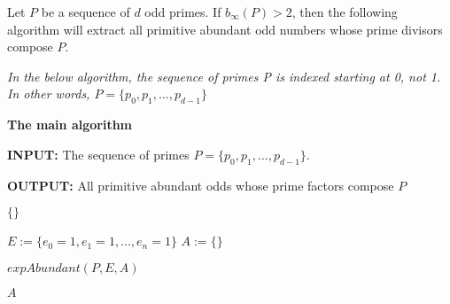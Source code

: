 \documentclass[../paper.tex]{subfiles}
\begin{document}
\begin{theorem} 
Let $P$ be a sequence of $d$ odd primes. If $b_{\infty}(P) > 2$, then the 
following algorithm will extract all primitive
abundant odd numbers whose prime divisors compose $P$.
\end{theorem}
%
%
%
%
%


\textit{In the below algorithm, the sequence of primes P is indexed 
starting at 0, not 1. In other words, $P = \{p_0, p_1, ..., p_{d-1}\}$}



{\setlength{\parindent}{0cm}

\textbf{The main algorithm}

\textbf{INPUT:} The sequence of primes 
$P = \{p_0, p_1, ..., p_{d-1}\}$.

\textbf{OUTPUT:} All primitive abundant odds whose prime factors
compose $P$

}


\begin{algorithmic}
  \RETURN $\{\}$
\ENDIF

\STATE $E := \{e_0 = 1,e_1 = 1,...,e_n = 1\}$
\STATE $A := \{ \}$ %

\STATE $expAbundant(P, E, A)$

\RETURN $A$

\end{algorithmic}
\end{document}
